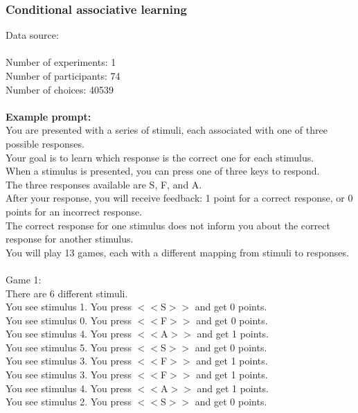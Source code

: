 \documentclass[pdflatex,sn-nature]{sn-jnl}%
\theoremstyle{thmstyleone}%
\theoremstyle{thmstyletwo}%
\theoremstyle{thmstylethree}%
\begin{document}
\subsubsection*{Conditional associative learning}
Data source: \cite{collins2014working} \\ $~$ \\
Number of experiments: 1 $~$\\ 
Number of participants: 74 $~$\\ 
Number of choices: 40539 $~$\\ 
 $~$\\ 
\textbf{Example prompt:}
 $~$\\ 
You are presented with a series of stimuli, each associated with one of three possible responses. $~$\\ 
Your goal is to learn which response is the correct one for each stimulus. $~$\\ 
When a stimulus is presented, you can press one of three keys to respond. $~$\\ 
The three responses available are S, F, and A. $~$\\ 
After your response, you will receive feedback: 1 point for a correct response, or 0 points for an incorrect response. $~$\\ 
The correct response for one stimulus does not inform you about the correct response for another stimulus. $~$\\ 
You will play 13 games, each with a different mapping from stimuli to responses. $~$\\ 
 $~$\\ 
Game 1: $~$\\ 
There are 6 different stimuli. $~$\\ 
You see stimulus 1. You press $<<$S$>>$ and get 0 points. $~$\\ 
You see stimulus 0. You press $<<$F$>>$ and get 0 points. $~$\\ 
You see stimulus 4. You press $<<$A$>>$ and get 1 points. $~$\\ 
You see stimulus 5. You press $<<$S$>>$ and get 0 points. $~$\\ 
You see stimulus 3. You press $<<$F$>>$ and get 1 points. $~$\\ 
You see stimulus 3. You press $<<$F$>>$ and get 1 points. $~$\\ 
You see stimulus 4. You press $<<$A$>>$ and get 1 points. $~$\\ 
You see stimulus 2. You press $<<$S$>>$ and get 0 points. $~$\\ 
\end{document}
